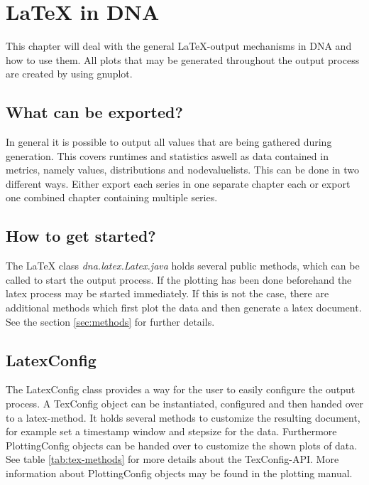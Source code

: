 \chapter{LaTeX in DNA}
This chapter will deal with the general LaTeX-output mechanisms in DNA and how to use them. All plots that may be generated throughout the output process are created by using gnuplot.

\section{What can be exported?}
In general it is possible to output all values that are being gathered during generation. This covers runtimes and statistics aswell as data contained in metrics, namely values, distributions and nodevaluelists. This can be done in two different ways. Either export each series in one separate chapter each or export one combined chapter containing multiple series.

\section{How to get started?}
The LaTeX class \textit{dna.latex.Latex.java} holds several public methods, which can be called to start the output process. If the plotting has been done beforehand the latex process may be started immediately. If this is not the case, there are additional methods which first plot the data and then generate a latex document. See the section \ref{sec:methods} for further details.

\section{LatexConfig}
The LatexConfig class provides a way for the user to easily configure the output process. A TexConfig object can be instantiated, configured and then handed over to a latex-method. It holds several methods to customize the resulting document, for example set a timestamp window and stepsize for the data. Furthermore PlottingConfig objects can be handed over to customize the shown plots of data. See table \ref{tab:tex-methods} for more details about the TexConfig-API. More information about PlottingConfig objects may be found in the plotting manual.


